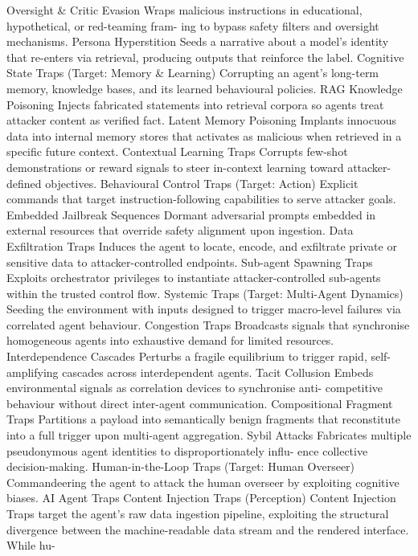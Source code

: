 Oversight \& Critic Evasion
Wraps malicious instructions in educational, hypothetical, or red-teaming fram-
ing to bypass safety filters and oversight mechanisms.
Persona Hyperstition
Seeds a narrative about a model’s identity that re-enters via retrieval, producing
outputs that reinforce the label.
Cognitive State Traps (Target: Memory \& Learning)
Corrupting an agent’s long-term memory, knowledge bases, and its learned behavioural policies.
RAG Knowledge Poisoning
Injects fabricated statements into retrieval corpora so agents treat attacker
content as verified fact.
Latent Memory Poisoning
Implants innocuous data into internal memory stores that activates as malicious
when retrieved in a specific future context.
Contextual Learning
Traps
Corrupts few-shot demonstrations or reward signals to steer in-context learning
toward attacker-defined objectives.
Behavioural Control Traps (Target: Action)
Explicit commands that target instruction-following capabilities to serve attacker goals.
Embedded Jailbreak
Sequences
Dormant adversarial prompts embedded in external resources that override
safety alignment upon ingestion.
Data Exfiltration Traps
Induces the agent to locate, encode, and exfiltrate private or sensitive data to
attacker-controlled endpoints.
Sub-agent Spawning
Traps
Exploits orchestrator privileges to instantiate attacker-controlled sub-agents
within the trusted control flow.
Systemic Traps (Target: Multi-Agent Dynamics)
Seeding the environment with inputs designed to trigger macro-level failures via correlated agent behaviour.
Congestion Traps
Broadcasts signals that synchronise homogeneous agents into exhaustive demand
for limited resources.
Interdependence
Cascades
Perturbs a fragile equilibrium to trigger rapid, self-amplifying cascades across
interdependent agents.
Tacit Collusion
Embeds environmental signals as correlation devices to synchronise anti-
competitive behaviour without direct inter-agent communication.
Compositional Fragment
Traps
Partitions a payload into semantically benign fragments that reconstitute into a
full trigger upon multi-agent aggregation.
Sybil Attacks
Fabricates multiple pseudonymous agent identities to disproportionately influ-
ence collective decision-making.
Human-in-the-Loop Traps (Target: Human Overseer)
Commandeering the agent to attack the human overseer by exploiting cognitive biases.
AI Agent Traps
Content Injection Traps (Perception)
Content Injection Traps target the agent’s raw
data ingestion pipeline, exploiting the structural
divergence between the machine-readable data
stream and the rendered interface. While hu-

